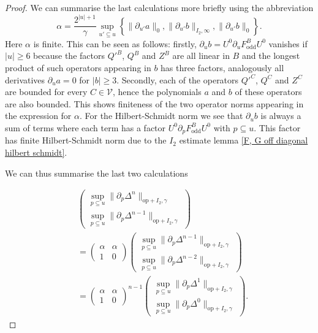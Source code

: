 \documentclass[b5paper,draft,openbib,12pt]{memoir}
\DeclareMathOperator{\odd}{odd}
\begin{document}
\begin{proof}
We can summarise the last calculations more briefly
using the abbreviation
\begin{equation}
\alpha=\frac{2^{|u|+1}}{\gamma} \sup_{u'\subseteq u}
\left\{\|\partial_{u'}a\|_{0},
\|\partial_{u'}b\|_{I_2,\infty},
\|\partial_{u'}b\|_{0}  \right\}.
\end{equation}
Here \(\alpha\) is finite. This can be seen as follows:
firstly, \(\partial_u b=U^0 \partial_u F^B_{\odd}U^0\) 
vanishes if \(|u|\ge 6\) because the factors 
\({Q'}^B\), \(Q^B\) and \(Z^B\) are all linear in 
\(B\) and the longest product of such operators 
appearing in \(b\) has three factors, analogously 
all derivatives \(\partial_u a=0\) for \(|b|\ge 3\).
Secondly, each of the operators  \({Q'}^C\), \(Q^C\) 
and \(Z^C\) are bounded for every \(C\in\mathcal{V}\),
hence the polynomials \(a\) and \(b\) of these 
operators are also bounded. This shows finiteness 
of the two operator norms appearing in the expression 
for \(\alpha\). For the Hilbert-Schmidt norm we 
  see 
that \(\partial_u b\) is always a sum of terms 
where each term has a factor 
\(U^0 \partial_p F_{\odd}^B U^0\) with \(p\subseteq u\).
This factor has finite Hilbert-Schmidt norm due to 
the \(I_2\) estimate lemma 
\ref{F, G off diagonal hilbert schmidt}.

We can thus summarise the last two calculations 

\begin{align}
&\begin{pmatrix} \sup_{p\subseteq u} \|\partial_p \Delta^{n} \|_{\mathrm{op}+I_2,\gamma}\\
\sup_{p\subseteq u} \|\partial_p \Delta^{n-1}\|_{\mathrm{op}+I_2,\gamma}\end{pmatrix}\\
&=\begin{pmatrix}\alpha & \alpha \\ 1 & 0 \end{pmatrix}
\begin{pmatrix} \sup_{p\subseteq u} \|\partial_p \Delta^{n-1}\|_{\mathrm{op}+I_2,\gamma}\\
\sup_{p\subseteq u} \|\partial_p \Delta^{n-2}\|_{\mathrm{op}+I_2,\gamma} \end{pmatrix}\\\label{analyticity converging recursion}
&=\begin{pmatrix}\alpha & \alpha \\ 1 & 0 \end{pmatrix}^{n-1}
  \begin{pmatrix} \sup_{p\subseteq u} \|\partial_p \Delta^{1}\|_{\mathrm{op}+I_2,\gamma}\\
  \sup_{p\subseteq u} \|\partial_p \Delta^{0}\|_{\mathrm{op}+I_2,\gamma} \end{pmatrix}.
\end{align}


\end{proof}
\end{document}
